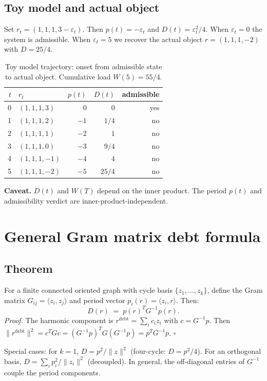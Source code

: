 \documentclass[11pt]{article}
\begin{document}
\subsection*{Toy model and actual object}
Set $r_t=(1,1,1,3-\varepsilon_t)$. Then $p(t)=-\varepsilon_t$ and
$D(t)=\varepsilon_t^2/4$. When $\varepsilon_t=0$ the system is admissible.
When $\varepsilon_t=5$ we recover the actual object $r=(1,1,1,-2)$ with $D=25/4$.

\begin{table}[h]
\centering
\begin{tabular}{r l r r r}
\toprule
$t$ & $r_t$ & $p(t)$ & $D(t)$ & admissible \\
\midrule
0 & $(1,1,1,3)$  & $0$  & $0$    & yes \\
1 & $(1,1,1,2)$  & $-1$ & $1/4$  & no  \\
2 & $(1,1,1,1)$  & $-2$ & $1$    & no  \\
3 & $(1,1,1,0)$  & $-3$ & $9/4$  & no  \\
4 & $(1,1,1,-1)$ & $-4$ & $4$    & no  \\
5 & $(1,1,1,-2)$ & $-5$ & $25/4$ & no  \\
\bottomrule
\end{tabular}
\caption{Toy model trajectory: onset from admissible state to actual object.
Cumulative load $W(5)=55/4$.}
\label{tab:dynamic}
\end{table}

\textbf{Caveat.} $D(t)$ and $W(T)$ depend on the inner product.
The period $p(t)$ and admissibility verdict are inner-product-independent.

\section{General Gram matrix debt formula}\label{sec:gram}

\subsection*{Theorem}
For a finite connected oriented graph with cycle basis $\{z_1,\ldots,z_k\}$,
define the Gram matrix $G_{ij}=\langle z_i,z_j\rangle$ and period vector
$p_i(r)=\langle z_i,r\rangle$. Then:
\[
D(r) \;=\; p(r)^T G^{-1} p(r).
\]
\textit{Proof.}
The harmonic component is $r^{\mathrm{debt}}=\sum_i c_i z_i$ with
$c=G^{-1}p$. Then $\|r^{\mathrm{debt}}\|^2=c^TGc=(G^{-1}p)^TG(G^{-1}p)=p^TG^{-1}p$. $\square$

Special cases: for $k=1$, $D=p^2/\|z\|^2$ (four-cycle: $D=p^2/4$).
For an orthogonal basis, $D=\sum_i p_i^2/\|z_i\|^2$ (decoupled). In general, the
off-diagonal entries of $G^{-1}$ couple the period components.
\end{document}
